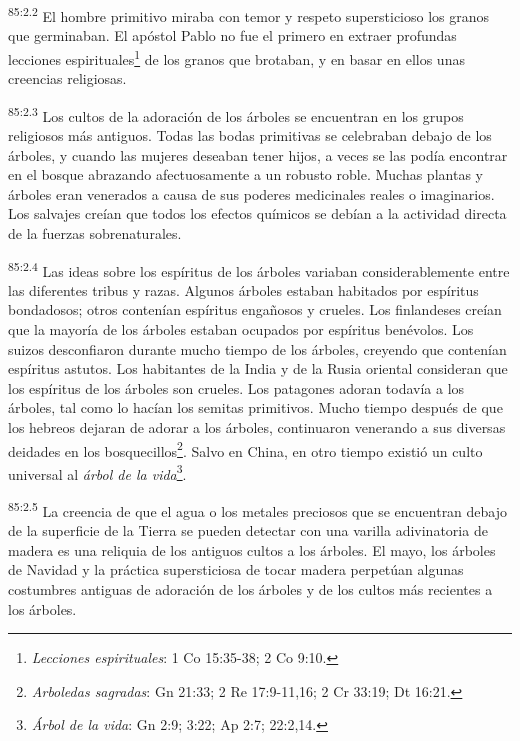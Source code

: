 \documentclass[twoside, 11pt]{book}
\begin{document}
\par
\textsuperscript{85:2.2} El hombre primitivo miraba con temor y respeto supersticioso los granos que germinaban. El apóstol Pablo no fue el primero en extraer profundas lecciones espirituales\footnote{\textit{Lecciones espirituales}: 1 Co 15:35-38; 2 Co 9:10.} de los granos que brotaban, y en basar en ellos unas creencias religiosas.

\par
\textsuperscript{85:2.3} Los cultos de la adoración de los árboles se encuentran en los grupos religiosos más antiguos. Todas las bodas primitivas se celebraban debajo de los árboles, y cuando las mujeres deseaban tener hijos, a veces se las podía encontrar en el bosque abrazando afectuosamente a un robusto roble. Muchas plantas y árboles eran venerados a causa de sus poderes medicinales reales o imaginarios. Los salvajes creían que todos los efectos químicos se debían a la actividad directa de la fuerzas sobrenaturales.

\par
\textsuperscript{85:2.4} Las ideas sobre los espíritus de los árboles variaban considerablemente entre las diferentes tribus y razas. Algunos árboles estaban habitados por espíritus bondadosos; otros contenían espíritus engañosos y crueles. Los finlandeses creían que la mayoría de los árboles estaban ocupados por espíritus benévolos. Los suizos desconfiaron durante mucho tiempo de los árboles, creyendo que contenían espíritus astutos. Los habitantes de la India y de la Rusia oriental consideran que los espíritus de los árboles son crueles. Los patagones adoran todavía a los árboles, tal como lo hacían los semitas primitivos. Mucho tiempo después de que los hebreos dejaran de adorar a los árboles, continuaron venerando a sus diversas deidades en los bosquecillos\footnote{\textit{Arboledas sagradas}: Gn 21:33; 2 Re 17:9-11,16; 2 Cr 33:19; Dt 16:21.}. Salvo en China, en otro tiempo existió un culto universal al \textit{árbol de la vida}\footnote{\textit{Árbol de la vida}: Gn 2:9; 3:22; Ap 2:7; 22:2,14.}.

\par
\textsuperscript{85:2.5} La creencia de que el agua o los metales preciosos que se encuentran debajo de la superficie de la Tierra se pueden detectar con una varilla adivinatoria de madera es una reliquia de los antiguos cultos a los árboles. El mayo, los árboles de Navidad y la práctica supersticiosa de tocar madera perpetúan algunas costumbres antiguas de adoración de los árboles y de los cultos más recientes a los árboles.
\end{document}
